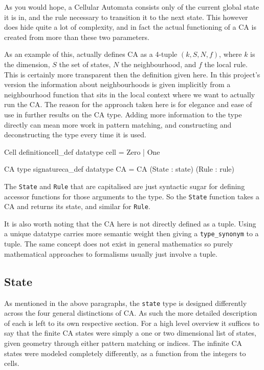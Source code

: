 As you would hope,
a Cellular Automata consists only of the current global state it is in,
and the rule necessary to transition it to the next state.
This however does hide quite a lot of complexity,
and in fact the actual functioning of a CA is created from more than these two parameters.

As an example of this,
\cite{yu} actually defines CA as a 4-tuple $(k, S, N, f)$,
where $k$ is the dimension,
$S$ the set of states,
$N$ the neighbourhood,
and $f$ the local rule.
This is certainly more transparent then the definition given here.
In this project's version the information about neighbourhoods is given implicitly from a neighbourhood function that sits in the local context where we want to actually run the CA.
The reason for the approach taken here is for elegance and ease of use in further results on the CA type.
Adding more information to the type directly can mean more work in pattern matching,
and constructing and deconstructing the type every time it is used.

\begin{myminted}{Cell definition}{cell_def}
    datatype cell = Zero | One
\end{myminted}

\begin{myminted}{CA type signature}{ca_def}
    datatype CA = CA (State : state) (Rule : rule)
\end{myminted}

The \texttt{State} and \texttt{Rule} that are capitalised are just syntactic sugar for defining accessor functions for those arguments to the type.
So the \texttt{State} function takes a CA and returns its state, 
and similar for \texttt{Rule}.

It is also worth noting that the CA here is not directly defined as a tuple.
Using a unique datatype carries more semantic weight then giving a \texttt{type_synonym} to a tuple.
The same concept does not exist in general mathematics so purely mathematical approaches to formalisms usually just involve a tuple.

\subsection{State}

As mentioned in the above paragraphs,
the \texttt{state} type is designed differently across the four general distinctions of CA.
As such the more detailed description of each is left to its own respective section.
For a high level overview it suffices to say that the finite CA states were simply a one or two dimensional list of states,
given geometry through either pattern matching or indices.
The infinite CA states were modeled completely differently,
as a function from the integers to cells.

